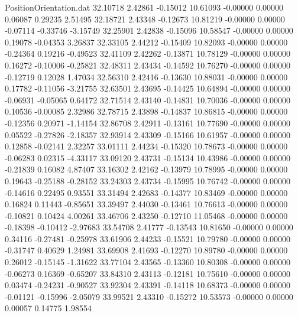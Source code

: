 \begin{filecontents}{PositionOrientation.dat}
  32.10718    2.42861   -0.15012    10.61093   -0.00000    0.00000    0.06087    0.29235    2.51495
  32.18721    2.43348   -0.12673    10.81219   -0.00000    0.00000   -0.07114   -0.33746   -3.15749
  32.25901    2.42838   -0.15096    10.58547   -0.00000    0.00000    0.19078   -0.04353    3.26837
  32.33105    2.44212   -0.15409    10.82093   -0.00000    0.00000   -0.24364    0.19216   -0.49523
  32.41109    2.42262   -0.13871    10.78129   -0.00000    0.00000    0.16272   -0.10006   -0.25821
  32.48311    2.43434   -0.14592    10.76270   -0.00000    0.00000   -0.12719    0.12028    1.47034
  32.56310    2.42416   -0.13630    10.88031   -0.00000    0.00000    0.17782   -0.11056   -3.21755
  32.63501    2.43695   -0.14425    10.64894   -0.00000    0.00000   -0.06931   -0.05065    0.64172
  32.71514    2.43140   -0.14831    10.70036   -0.00000    0.00000    0.10536   -0.00085    2.32986
  32.78715    2.43898   -0.14837    10.86815   -0.00000    0.00000   -0.12356    0.20971   -1.14154
  32.86708    2.42911   -0.13161    10.77690   -0.00000    0.00000    0.05522   -0.27826   -2.18357
  32.93914    2.43309   -0.15166    10.61957   -0.00000    0.00000    0.12858   -0.02141    2.32257
  33.01111    2.44234   -0.15320    10.78673   -0.00000    0.00000   -0.06283    0.02315   -4.33117
  33.09120    2.43731   -0.15134    10.43986   -0.00000    0.00000   -0.21839    0.16082    4.87407
  33.16302    2.42162   -0.13979    10.78995   -0.00000    0.00000    0.19643   -0.25188   -0.28152
  33.24303    2.43734   -0.15995    10.76742   -0.00000    0.00000   -0.14616    0.22495    0.93551
  33.31494    2.42683   -0.14377    10.83469   -0.00000    0.00000    0.16824    0.11443   -0.85651
  33.39497    2.44030   -0.13461    10.76613   -0.00000    0.00000   -0.10821    0.10424    4.00261
  33.46706    2.43250   -0.12710    11.05468   -0.00000    0.00000   -0.18398   -0.10412   -2.97683
  33.54708    2.41777   -0.13543    10.81650   -0.00000    0.00000    0.34116   -0.27481   -0.25978
  33.61906    2.44233   -0.15521    10.79780   -0.00000    0.00000   -0.31747    0.40629    1.24981
  33.69908    2.41693   -0.12270    10.89780   -0.00000    0.00000    0.26012   -0.15145   -1.31622
  33.77104    2.43565   -0.13360    10.80308   -0.00000    0.00000   -0.06273    0.16369   -0.65207
  33.84310    2.43113   -0.12181    10.75610   -0.00000    0.00000    0.03474   -0.24231   -0.90527
  33.92304    2.43391   -0.14118    10.68373   -0.00000    0.00000   -0.01121   -0.15996   -2.05079
  33.99521    2.43310   -0.15272    10.53573   -0.00000    0.00000    0.00057    0.14775    1.98554

\end{filecontents}
